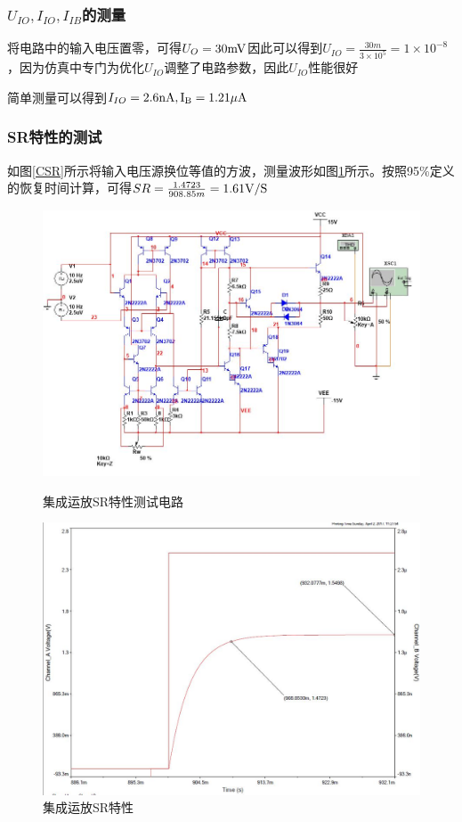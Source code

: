\documentclass[UTF8,a4paper]{ctexart}
\begin{document}
\subsubsection{$U_{IO},I_{IO},I_{IB}$的测量}
将电路中的输入电压置零，可得$U_O=30\rm{mV}$因此可以得到$U_{IO}=\frac{30m}{3\times10^5}=1\times10^{-8}$，因为仿真中专门为优化$U_{IO}$调整了电路参数，因此$U_{IO}$性能很好

简单测量可以得到$I_{IO}=2.6\rm{nA},I_{B}=1.21\mu\rm{A}$
\subsubsection{SR特性的测试}
如图\ref{CSR}所示将输入电压源换位等值的方波，测量波形如图\ref{SR}所示。按照95\%定义的恢复时间计算，可得$SR=\frac{1.4723}{908.85m}=1.61\rm{V/S}$
\begin{figure}
\centering
\includegraphics[width=\textwidth]{CSR.jpg}
\caption{集成运放SR特性测试电路}
\label{CSR}
\includegraphics[width=\textwidth]{SR.jpg}
\caption{集成运放SR特性}
\label{SR}
\end{figure}
\end{document}

